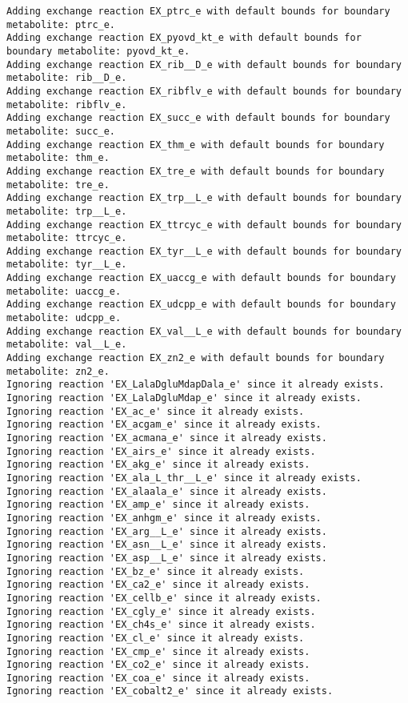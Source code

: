 \documentclass[
  letterpaper,
  DIV=11,
  numbers=noendperiod]{scrartcl}
\begin{document}
\begin{verbatim}
Adding exchange reaction EX_ptrc_e with default bounds for boundary metabolite: ptrc_e.
Adding exchange reaction EX_pyovd_kt_e with default bounds for boundary metabolite: pyovd_kt_e.
Adding exchange reaction EX_rib__D_e with default bounds for boundary metabolite: rib__D_e.
Adding exchange reaction EX_ribflv_e with default bounds for boundary metabolite: ribflv_e.
Adding exchange reaction EX_succ_e with default bounds for boundary metabolite: succ_e.
Adding exchange reaction EX_thm_e with default bounds for boundary metabolite: thm_e.
Adding exchange reaction EX_tre_e with default bounds for boundary metabolite: tre_e.
Adding exchange reaction EX_trp__L_e with default bounds for boundary metabolite: trp__L_e.
Adding exchange reaction EX_ttrcyc_e with default bounds for boundary metabolite: ttrcyc_e.
Adding exchange reaction EX_tyr__L_e with default bounds for boundary metabolite: tyr__L_e.
Adding exchange reaction EX_uaccg_e with default bounds for boundary metabolite: uaccg_e.
Adding exchange reaction EX_udcpp_e with default bounds for boundary metabolite: udcpp_e.
Adding exchange reaction EX_val__L_e with default bounds for boundary metabolite: val__L_e.
Adding exchange reaction EX_zn2_e with default bounds for boundary metabolite: zn2_e.
Ignoring reaction 'EX_LalaDgluMdapDala_e' since it already exists.
Ignoring reaction 'EX_LalaDgluMdap_e' since it already exists.
Ignoring reaction 'EX_ac_e' since it already exists.
Ignoring reaction 'EX_acgam_e' since it already exists.
Ignoring reaction 'EX_acmana_e' since it already exists.
Ignoring reaction 'EX_airs_e' since it already exists.
Ignoring reaction 'EX_akg_e' since it already exists.
Ignoring reaction 'EX_ala_L_thr__L_e' since it already exists.
Ignoring reaction 'EX_alaala_e' since it already exists.
Ignoring reaction 'EX_amp_e' since it already exists.
Ignoring reaction 'EX_anhgm_e' since it already exists.
Ignoring reaction 'EX_arg__L_e' since it already exists.
Ignoring reaction 'EX_asn__L_e' since it already exists.
Ignoring reaction 'EX_asp__L_e' since it already exists.
Ignoring reaction 'EX_bz_e' since it already exists.
Ignoring reaction 'EX_ca2_e' since it already exists.
Ignoring reaction 'EX_cellb_e' since it already exists.
Ignoring reaction 'EX_cgly_e' since it already exists.
Ignoring reaction 'EX_ch4s_e' since it already exists.
Ignoring reaction 'EX_cl_e' since it already exists.
Ignoring reaction 'EX_cmp_e' since it already exists.
Ignoring reaction 'EX_co2_e' since it already exists.
Ignoring reaction 'EX_coa_e' since it already exists.
Ignoring reaction 'EX_cobalt2_e' since it already exists.

\end{verbatim}
\end{document}
